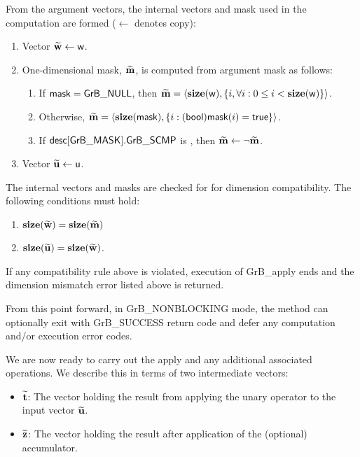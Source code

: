 From the argument vectors, the internal vectors and mask used in 
the computation are formed ($\leftarrow$ denotes copy):
\begin{enumerate}
	\item Vector ${\bf \widetilde{w}} \leftarrow {\sf w}$.

	\item One-dimensional mask, ${\bf \widetilde{m}}$, is computed from 
    argument {\sf mask} as follows:
	\begin{enumerate}
		\item	If ${\sf mask} = {\sf GrB\_NULL}$, then ${\bf \widetilde{m}} = 
        \langle \bold{size}({\sf w}), \{i, \forall i : 0 \leq i < 
        \bold{size}({\sf w}) \} \rangle$.

		\item	Otherwise, ${\bf \widetilde{m}} = 
        \langle \bold{size}({\sf mask}), \{i : ({\sf bool}){\sf mask}(i) = 
        {\sf true}\} \rangle$.

		\item	If ${\sf desc[GrB\_MASK].GrB\_SCMP}$ is \true, then 
        ${\bf \widetilde{m}} \leftarrow \neg {\bf \widetilde{m}}$.
	\end{enumerate}

	\item Vector ${\bf \widetilde{u}} \leftarrow {\sf u}$.
    
\end{enumerate}

The internal vectors and masks are checked for for dimension compatibility. 
The following conditions must hold:
\begin{enumerate}
	\item $\bold{size}({\bf \widetilde{w}}) = \bold{size}({\bf \widetilde{m}})$
	\item $\bold{size}({\bf \widetilde{u}}) = \bold{size}({\bf \widetilde{w}})$.
\end{enumerate}
If any compatibility rule above is violated, execution of {\sf GrB\_apply} ends and 
the dimension mismatch error listed above is returned.

From this point forward, in {\sf GrB\_NONBLOCKING} mode, the method can optionally exit
with {\sf GrB\_SUCCESS} return code and defer any computation and/or execution error codes.

We are now ready to carry out the apply and any additional 
associated operations.  We describe this in terms of two intermediate vectors:
\begin{itemize}
	\item ${\bf \widetilde{t}}$: The vector holding the result from applying the unary operator to the input vector
    ${\bf \widetilde{u}}$.
	\item ${\bf \widetilde{z}}$: The vector holding the result after 
    application of the (optional) accumulator.
\end{itemize}

